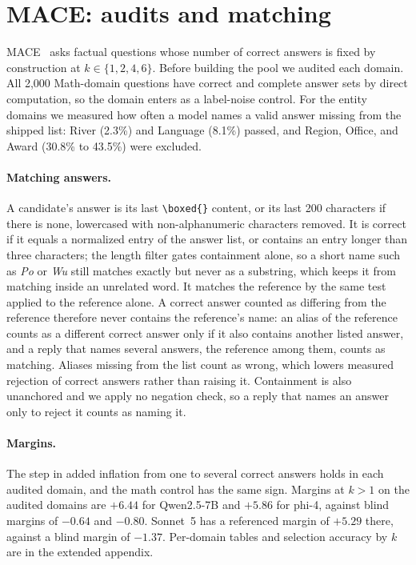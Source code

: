 \FloatBarrier
\section{\textsc{MACE}: audits and matching}
\label{app:mace}

\textsc{MACE}~\citep{mace2026} asks factual questions whose number of correct answers is fixed by construction at $k \in \{1,2,4,6\}$. Before building the pool we audited each domain. All 2,000 Math-domain questions have correct and complete answer sets by direct computation, so the domain enters as a label-noise control. For the entity domains we measured how often a model names a valid answer missing from the shipped list: River (2.3\%) and Language (8.1\%) passed, and Region, Office, and Award (30.8\% to 43.5\%) were excluded.

\paragraph{Matching answers.} A candidate's answer is its last \texttt{\textbackslash boxed\{\}} content, or its last 200 characters if there is none, lowercased with non-alphanumeric characters removed. It is correct if it equals a normalized entry of the answer list, or contains an entry longer than three characters; the length filter gates containment alone, so a short name such as \emph{Po} or \emph{Wu} still matches exactly but never as a substring, which keeps it from matching inside an unrelated word. It matches the reference by the same test applied to the reference alone. A correct answer counted as differing from the reference therefore never contains the reference's name: an alias of the reference counts as a different correct answer only if it also contains another listed answer, and a reply that names several answers, the reference among them, counts as matching. Aliases missing from the list count as wrong, which lowers measured rejection of correct answers rather than raising it. Containment is also unanchored and we apply no negation check, so a reply that names an answer only to reject it counts as naming it.

\paragraph{Margins.} The step in added inflation from one to several correct answers holds in each audited domain, and the math control has the same sign.\pre{} Margins at $k{>}1$ on the audited domains are $+6.44$ for Qwen2.5-7B and $+5.86$ for phi-4, against blind margins of $-0.64$ and $-0.80$. Sonnet~5 has a referenced margin of $+5.29$ there, against a blind margin of $-1.37$. Per-domain tables and selection accuracy by $k$ are in the extended appendix.

